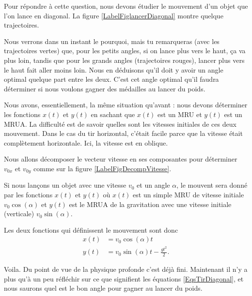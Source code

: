 Pour répondre à cette question, nous devons étudier le mouvement d'un objet que l'on lance en diagonal. La figure \ref{LabelFiglancerDiagonal} montre quelque trajectoires.
\newcommand{\CaptionFiglancerDiagonal}{La trajectoire de quelque mobiles lancés en diagonal.}

Nous verrons dans un instant le pourquoi, mais tu remarqueras (avec les trajectoires vertes) que, pour les petits angles, si on lance plus vers le haut, ça va plus loin, tandis que pour les grands angles (trajectoires rouges), lancer plus vers le haut fait aller moins loin. Nous en déduisons qu'il doit y avoir un angle optimal quelque part entre les deux. C'est cet angle optimal qu'il faudra déterminer si nous voulons gagner des médailles au lancer du poids.

Nous avons, essentiellement, la même situation qu'avant : nous devons déterminer les fonctions $x(t)$ et $y(t)$ en sachant que $x(t)$ est un MRU et $y(t)$ est un MRUA. La difficulté est de savoir quelles sont les vitesses initiales de ces deux mouvement. Dans le cas du tir horizontal, c'était facile parce que la vitesse était complètement horizontale. Ici, la vitesse est en oblique.

\newcommand{\CaptionFigDecompVitesse}{Tir oblique à différents angles. Un tout petit peu de trigonométrie nous donne les composantes de la vitesse initiale selon les deux axes.}


\begin{idee}
	Nous allons décomposer le vecteur vitesse en ses composantes pour déterminer $v_{0x}$ et $v_{0y}$ comme sur la figure \ref{LabelFigDecompVitesse}.
\end{idee}

Si nous lançons un objet avec une vitesse $v_0$ et un angle $\alpha$, le mouvent sera donné par les fonctions $x(t)$ et $y(t)$ où $x(t)$ est un simple MRU de vitesse initiale $v_0\cos(\alpha)$ et $y(t)$ est le MRUA de la gravitation avec une vitesse initiale (verticale) $v_0\sin(\alpha)$.

Les deux fonctions qui définissent le mouvement sont donc
\begin{subequations}		\label{EqsTirDiagonal}
	\begin{align}
		x(t)&=v_0\cos(\alpha) t\\
		y(t)&=v_0\sin(\alpha) t -\frac{ gt^2 }{ 2 }.
	\end{align}
\end{subequations}

Voila. Du point de vue de la physique profonde c'est déjà fini. Maintenant il n'y a plus qu'à un peu réfléchir sur ce que signifient les équations \eqref{EqsTirDiagonal}, et nous saurons quel est le bon angle pour gagner au lancer du poids. 

